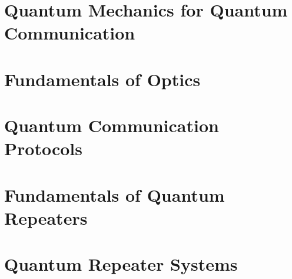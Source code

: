 \documentclass[6x9]{newmath}
\begin{document}



\part{Quantum Mechanics for Quantum Communication}






\part{Fundamentals of Optics}





\part{Quantum Communication Protocols}





\part{Fundamentals of Quantum Repeaters}





\part{Quantum Repeater Systems}




\endmatter


\endnotes

\nocite{*}



\printindex
\onecolumn

\end{document}
